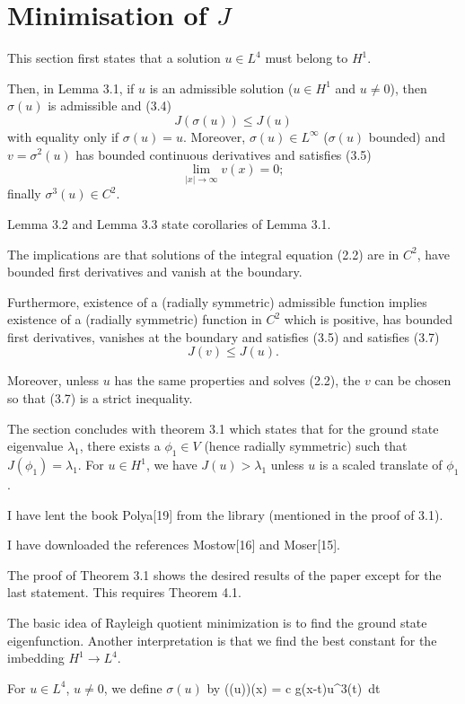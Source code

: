 \section{Minimisation of $J$}
{\new This section first states that a solution $u\in L^4$ must belong to $H^1$.

Then, in Lemma 3.1, if $u$ is an admissible solution ($u\in H^1$ and $u\neq 0$), then $\sigma(u)$ is admissible and
(3.4) $$J(\sigma(u))\leq J(u)$$
with equality only if $\sigma(u) = u$. Moreover, $\sigma(u)\in L^\infty$ ($\sigma(u)$ bounded) and $v=\sigma^2(u)$ has bounded continuous derivatives and satisfies
(3.5) $$\underset{|x|\to\infty}{\lim} v(x)=0;$$
finally $\sigma^3(u)\in C^2$.

Lemma 3.2 and Lemma 3.3 state corollaries of Lemma 3.1.

The implications are that solutions of the integral equation (2.2) are in $C^2$, have bounded first derivatives and vanish at the boundary.

Furthermore, existence of a (radially symmetric) admissible function implies existence of a (radially symmetric) function in $C^2$ which is positive, has bounded first derivatives, vanishes at the boundary and satisfies (3.5) and satisfies
(3.7) $$J(v)\leq J(u).$$

Moreover, unless $u$ has the same properties and solves (2.2), the $v$ can be chosen so that (3.7) is a strict inequality.

The section concludes with theorem 3.1 which states that for the ground state eigenvalue $\lambda_1$, there exists a $\phi_1\in V$ (hence radially symmetric) such that $J(\phi_1)=\lambda_1$. For $u\in H^1$, we have $J(u)>\lambda_1$ unless $u$ is a scaled translate of $\phi_1$.

I have lent the book Polya[19] from the library (mentioned in the proof of 3.1).

I have downloaded the references Mostow[16] and Moser[15].

The proof of Theorem 3.1 shows the desired results of the paper except for the last statement. This requires Theorem 4.1.}

{\revise The basic idea of Rayleigh quotient minimization is to find the ground state eigenfunction. Another interpretation is that we find the best constant for the imbedding $H^1 \to L^4$.}

{\rewrite For $u\in L^4$, $u\neq 0$, we define $\sigma(u)$ by 
\be \label{sigmadef} \left(\sigma(u)\right)(x) = c \int g(x-t)u^3(t)~dt \ee}

